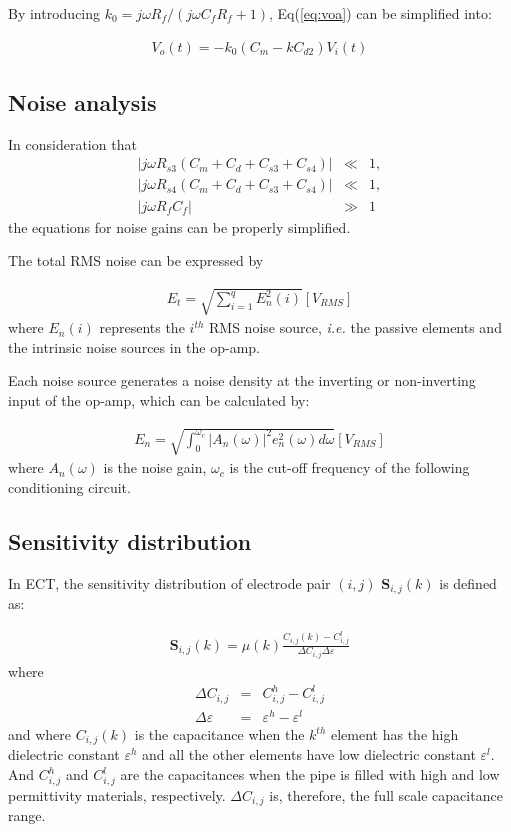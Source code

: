 By introducing $k_0 = {j\omega R_f}/(j\omega C_f R_f +1)$, Eq(\ref{eq:voa}) can be simplified into:

\begin{eqnarray}
V_o(t) =-k_0(C_m - kC_{d2})V_i(t)
\label{eq:vob}
\end{eqnarray}


\subsection{Noise analysis}


In consideration that
\begin{eqnarray}
|j\omega R_{s3}(C_m+C_d+C_{s3}+C_{s4})| &\ll&1,\nonumber\\
|j\omega R_{s4}(C_m+C_d+C_{s3}+C_{s4})| &\ll&1,\nonumber\\
|j\omega R_fC_f| &\gg&1\nonumber
\label{eq:approx_cond}
\end{eqnarray}
the equations for noise gains can be properly simplified.

The total RMS noise can be expressed by

\begin{eqnarray}
E_{t} = \sqrt{\sum_{i=1}^{q} E_{n}^2(i)}[V_{RMS}]
\label{eq:vrms_sum}
\end{eqnarray}
where $E_{n}(i)$ represents the $i^{th}$ RMS noise source, \textit{i.e.} the passive elements and the intrinsic noise sources in the op-amp.

Each noise source generates a noise density at the inverting or non-inverting input of the op-amp, which can be  calculated by:

\begin{eqnarray}
E_n = \sqrt{\int_{0}^{\omega_c}|A_n(\omega)|^2 e_{n}^{2}(\omega)d \omega}[V_{RMS}]
\label{eq:vrms}
\end{eqnarray}
where $A_n(\omega)$ is the noise gain, $\omega_c$ is the cut-off frequency of the following conditioning circuit.

\subsection{Sensitivity distribution}

In ECT, the sensitivity distribution of electrode pair $(i, j)$ $\mathbf{S}_{i,j}(k)$ is defined as:

\begin{eqnarray}
\mathbf{S}_{i,j}(k)=\mu (k)\frac{C_{i,j}(k)-C_{i,j}^l}{\Delta C_{i,j}\Delta \varepsilon}
\label{eq:sensitivity}
\end{eqnarray}
where
\begin{eqnarray}
\Delta C_{i,j} &=&C_{i,j}^h-C_{i,j}^l\\
\Delta \varepsilon &=&\varepsilon^h-\varepsilon^l
\label{eq:sensitivity2}
\end{eqnarray}
and where $C_{i,j}(k)$ is the capacitance when the $k^{th}$ element has the high dielectric constant $\varepsilon^h$ and all the other elements have low dielectric constant $\varepsilon^l$. And $C_{i,j}^h$ and $C_{i,j}^l$ are the capacitances when the pipe is filled with  high and low permittivity materials, respectively. $\Delta C_{i,j}$ is, therefore, the full scale capacitance range.



\cite{Bragos1994}
